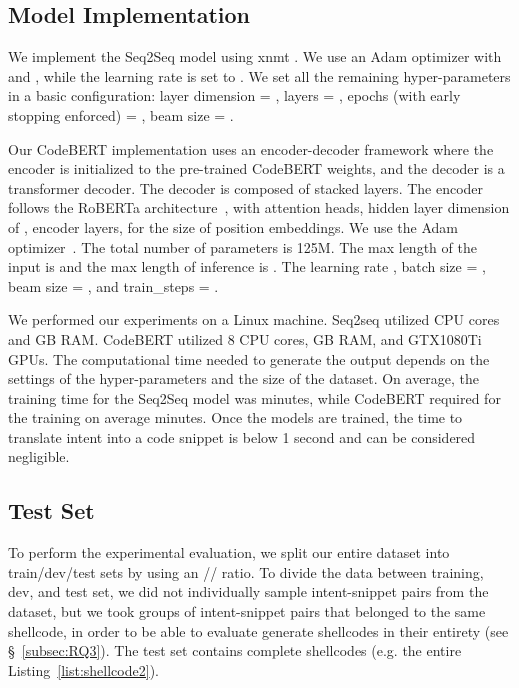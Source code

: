 \subsection{Model Implementation}
We implement the Seq2Seq model using {\selectfont xnmt} \cite{neubig2018xnmt}. We use an Adam optimizer \cite{kingma2014adam} with  and , while the learning rate  is set to . We set all the remaining hyper-parameters in a basic configuration: layer dimension = , layers = , epochs (with early stopping enforced) = , beam size = . 

Our CodeBERT implementation uses an encoder-decoder framework where the encoder is initialized to the pre-trained CodeBERT weights, and the decoder is a transformer decoder. The decoder is composed of  stacked layers. The encoder follows the RoBERTa architecture~\cite{liu2019roberta}, with  attention heads, hidden layer dimension of ,  encoder layers,  for the size of position embeddings. We use the Adam optimizer~\cite{kingma2014adam}. The total number of parameters is 125M. The max length of the input is  and the max length of inference is . The learning rate , batch size = , beam size = , and train\_steps = .

We performed our experiments on a Linux machine. Seq2seq utilized  CPU cores and  GB RAM. CodeBERT utilized 8 CPU cores,  GB RAM, and  GTX1080Ti GPUs.
The computational time needed to generate the output depends on the settings of the hyper-parameters and the size of the dataset. 
On average, the training time for the Seq2Seq model was  minutes, while CodeBERT required for the training on average  minutes.
Once the models are trained, the time to translate intent into a code snippet is below 1 second and can be considered negligible. 

\subsection{Test Set}
To perform the experimental evaluation, we split our entire dataset into train/dev/test sets by using an // ratio.
To divide the data between training, dev, and test set, we did not individually sample intent-snippet pairs from the dataset, but we took groups of intent-snippet pairs that belonged to the same shellcode, in order to be able to evaluate generate shellcodes in their entirety (see \S~\ref{subsec:RQ3}). The test set contains  complete shellcodes (e.g. the entire Listing~\ref{list:shellcode2}). 


